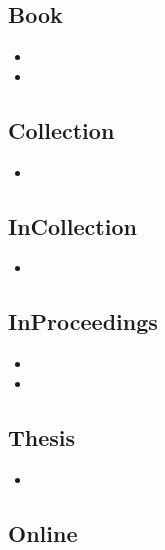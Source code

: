 \subsection{Book}

\begin{itemize}
\item {}
\item {}
\end{itemize}

\subsection{Collection}

\begin{itemize}
\item {}
\end{itemize}

\subsection{InCollection}

\begin{itemize}
\item {}
\end{itemize}

\subsection{InProceedings}

\begin{itemize}
\item {}
\item {}
\end{itemize}

\subsection{Thesis}

\begin{itemize}
\item {}
\end{itemize}

\subsection{Online}


